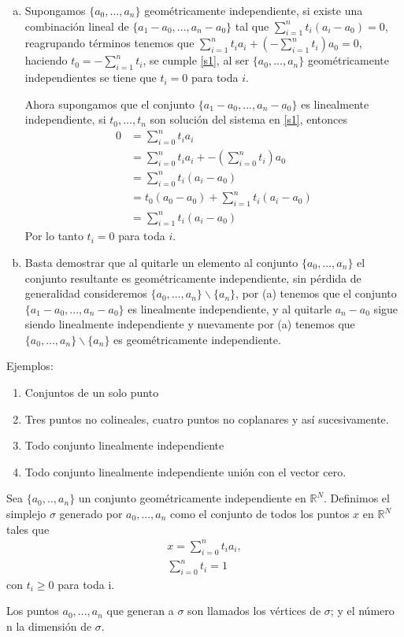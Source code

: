 \begin{Dem}
\begin{enumerate}[(a)]
\item Supongamos $\{a_0,...,a_n\}$ geométricamente independiente, si existe una combinación lineal de $\{a_1-a_0,...,a_n-a_0\}$ tal que $\sum_{i=1}^{n}t_i(a_i-a_0)=0$, reagrupando términos tenemos que $\sum_{i=1}^{n}t_ia_i + (-\sum_{i=1}^{n}t_i)a_0=0$, haciendo $t_0 = -\sum_{i=1}^{n}t_i$, se cumple \ref{s1}, al ser $\{a_0,...,a_n\}$ geométricamente independientes se tiene que $t_i=0$ para toda $i$.

Ahora supongamos que el conjunto $\{a_1-a_0,...,a_n-a_0\}$ es linealmente independiente, si $t_0,...,t_n$ son solución del sistema en \ref{s1}, entonces 
\begin{align*}
 0&=\sum_{i=0}^{n}t_ia_i\\
 &=\sum_{i=0}^{n}t_ia_i + -(\sum_{i=0}^{n}t_i)a_0\\
 &=\sum_{i=0}^{n}t_i(a_i-a_0)\\ 
 &= t_0(a_0-a_0) + \sum_{i=1}^{n}t_i(a_i-a_0)\\
 &=\sum_{i=1}^{n}t_i(a_i-a_0)
\end{align*}
Por lo tanto $t_i=0$ para toda $i$.
\item Basta demostrar que al quitarle un elemento al conjunto $\{a_0,...,a_n\}$
el conjunto resultante es geométricamente independiente, sin pérdida
de generalidad consideremos $\{a_0,...,a_n\}\backslash\{a_n\}$, por (a) tenemos que el
conjunto $\{a_1-a_0,...,a_n-a_0\}$ es linealmente independiente, y al quitarle
$a_n-a_0$ sigue siendo linealmente independiente y nuevamente por (a) 
tenemos que $\{a_0,...,a_n\}\backslash\{a_n\}$ es geométricamente independiente.
\end{enumerate}
\end{Dem}
Ejemplos:
\begin{enumerate}
\item Conjuntos de un solo punto
\item Tres puntos no colineales, cuatro puntos no coplanares y así sucesivamente.  
\item Todo conjunto linealmente independiente
\item Todo conjunto linealmente independiente unión con el vector cero. 
\end{enumerate}

\begin{Defi}[Simplejo]
Sea $\{a_0,..,a_n\}$ un conjunto geométricamente independiente en  $\mathbb{R}^{N}$. Definimos el simplejo  $\sigma$ generado por $a_0,...,a_n$ como el conjunto de todos los puntos $x$ en $\mathbb{R}^{N}$ tales que 
\begin{equation}\label{s2}
\begin{split}
x = \sum_{i=0}^{n}t_ia_i,\\
\sum_{i=0}^{n}t_i=1
\end{split}
\end{equation}
con $t_i\geqslant 0$ para toda i.

Los puntos $a_0,...,a_n$ que generan a $\sigma$ son llamados los vértices de $\sigma$; y el número n la dimensión de $\sigma$.
\end{Defi}

